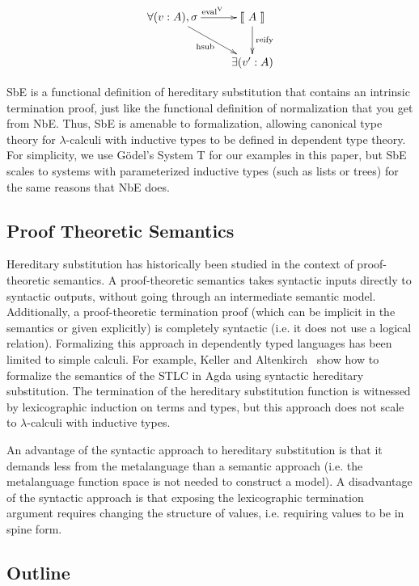\documentclass[runningheads,a4paper]{llncs}
\def\cevalv{\fun{eval}^\con{V}}
\newcommand{\ascribe}[2]{(#1 : #2)}
\newcommand{\els}[1]{\llbracket ~ #1 ~ \rrbracket}
\newcommand{\con}[1]{\textmd{#1}}
\newcommand{\fun}[1]{\textmd{#1}}
\begin{document}
\begin{displaymath}
    \xymatrix{
          \forall{\ascribe{v}{A}, \sigma}
          \ar[dr]_{\fun{hsub}}
          \ar[r]^{\cevalv}
        & {\els{A}}
          \ar[d]^{\large{\fun{reify}}}
\\      & \exists{\ascribe{v'}{A}} }
\end{displaymath}

SbE is a functional definition of hereditary substitution that
contains an intrinsic termination proof, just like the functional
definition of normalization that you get from NbE. Thus, SbE is
amenable to formalization, allowing canonical type theory for
$\lambda$-calculi with inductive types to be defined in dependent type
theory. For simplicity, we use G{\"o}del's System T for our examples
in this paper, but SbE scales to systems with parameterized inductive
types (such as lists or trees) for the same reasons that NbE does.

\subsection{Proof Theoretic Semantics}
\label{sec:proof-theoretic}

Hereditary substitution has historically been studied in the context
of proof-theoretic semantics. A proof-theoretic semantics takes
syntactic inputs directly to syntactic outputs, without going through
an intermediate semantic model. Additionally, a proof-theoretic
termination proof (which can be implicit in the semantics or given explicitly) is completely
syntactic (i.e. it does not use a logical relation).
Formalizing this approach in
dependently typed languages has been limited to simple calculi.
For example, Keller and Altenkirch~\cite{keller} show how to formalize the
semantics of the STLC in Agda using syntactic hereditary substitution.
The termination of the hereditary substitution function is witnessed
by lexicographic induction on terms and types, but this approach does
not scale to $\lambda$-calculi with inductive types.

An advantage of the syntactic approach to hereditary substitution is
that it demands less from the metalanguage than a semantic
approach (i.e. the metalanguage
function space is not needed to construct a model). A disadvantage of
the syntactic approach is that exposing the lexicographic termination
argument requires changing the structure of values, i.e. requiring
values to be in spine form.

\subsection{Outline}
\end{document}
